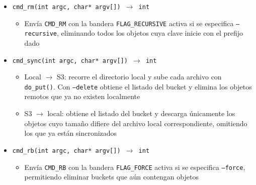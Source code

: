 \documentclass[12pt, letterpaper]{article}
\begin{document}
\begin{itemize}
        \begin{itemize}
            \item Local $\to$ S3: reutiliza la lógica de \texttt{cmd\_cp} 
                  y elimina el archivo local con \texttt{remove()}
            \item S3 $\to$ local: descarga el objeto con \texttt{do\_get()} 
                  y lo elimina del bucket con \texttt{CMD\_RM}
            \item S3 $\to$ S3: envía \texttt{CMD\_MV} con 
                  \texttt{key2 = "bucket\_dst\textbackslash nkey\_dst"} 
                  para que el servidor realice la operación atómicamente
        \end{itemize}
    \item \texttt{cmd\_rm(int argc, char* argv[]) $\to$ int}
        \begin{itemize}
            \item Envía \texttt{CMD\_RM} con la bandera 
                  \texttt{FLAG\_RECURSIVE} activa si se especifica 
                  \texttt{--recursive}, eliminando todos los objetos 
                  cuya clave inicie con el prefijo dado
        \end{itemize}
    \item \texttt{cmd\_sync(int argc, char* argv[]) $\to$ int}
        \begin{itemize}
            \item Local $\to$ S3: recorre el directorio local y sube 
                  cada archivo con \texttt{do\_put()}. Con 
                  \texttt{--delete} obtiene el listado del bucket y 
                  elimina los objetos remotos que ya no existen localmente
            \item S3 $\to$ local: obtiene el listado del bucket y 
                  descarga únicamente los objetos cuyo tamaño difiere 
                  del archivo local correspondiente, omitiendo los que 
                  ya están sincronizados
        \end{itemize}
    \item \texttt{cmd\_rb(int argc, char* argv[]) $\to$ int}
        \begin{itemize}
            \item Envía \texttt{CMD\_RB} con la bandera 
                  \texttt{FLAG\_FORCE} activa si se especifica 
                  \texttt{--force}, permitiendo eliminar buckets que 
                  aún contengan objetos
        \end{itemize}


\end{itemize}
\end{document}
